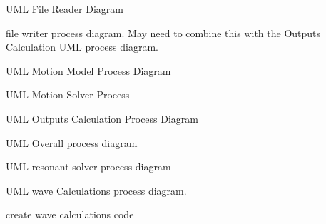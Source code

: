 
\begin{DoxyRefList}
\item[\label{todo__todo000001}%
\hypertarget{todo__todo000001}{}%
Page \hyperlink{uml_filereader}{File Reader Process} ]U\-M\-L File Reader Diagram 
\item[\label{todo__todo000008}%
\hypertarget{todo__todo000008}{}%
Page \hyperlink{uml_writingfiles}{File Writer Process} ]file writer process diagram. May need to combine this with the Outputs Calculation U\-M\-L process diagram. 
\item[\label{todo__todo000002}%
\hypertarget{todo__todo000002}{}%
Page \hyperlink{uml_motionmodel}{Motion Model Process} ]U\-M\-L Motion Model Process Diagram 
\item[\label{todo__todo000003}%
\hypertarget{todo__todo000003}{}%
Page \hyperlink{uml_motionsolver}{Motion Solver Process} ]U\-M\-L Motion Solver Process 
\item[\label{todo__todo000004}%
\hypertarget{todo__todo000004}{}%
Page \hyperlink{uml_outputscalculation}{Outputs Calculation} ]U\-M\-L Outputs Calculation Process Diagram 
\item[\label{todo__todo000005}%
\hypertarget{todo__todo000005}{}%
Page \hyperlink{uml_overall}{Overall Process} ]U\-M\-L Overall process diagram 
\item[\label{todo__todo000006}%
\hypertarget{todo__todo000006}{}%
Page \hyperlink{uml_resonantsolver}{Resonant Solver Process} ]U\-M\-L resonant solver process diagram 
\item[\label{todo__todo000007}%
\hypertarget{todo__todo000007}{}%
Page \hyperlink{uml_wavecalculation}{Wave Calculations Process} ]U\-M\-L wave Calculations process diagram. 

create wave calculations code
\end{DoxyRefList}
